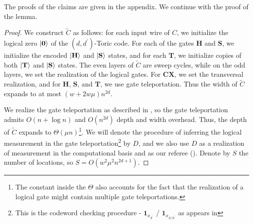 The proofs of the claims are given in the appendix. We continue with the proof of the lemma.
  \begin{proof}
    We construct $\tilde{C}$ as follows: for each input wire of $C$, we initialize the logical zero $\ket{\mathbf{0}}$ of the $(d,d^{\prime})$-Toric code. For each of the gates $\mathbf{H}$ and $\mathbf{S}$, we initialize the encoded $\ket{\mathbf{H}}$ and $\ket{\mathbf{S}}$ states, and for each $\mathbf{T}$, we initialize copies of both $\ket{\mathbf{T}}$ and $\ket{\mathbf{S}}$ states. The even layers of $\tilde{C}$ are sweep cycles, while on the odd layers, we set the realization of the logical gates. For $\mathbf{CX}$, we set the transversal realization, and for $\mathbf{H}$, $\mathbf{S}$, and $\mathbf{T}$, we use gate teleportation. Thus the width of $\tilde{C}$ expands to at most $ (w + 2w\mu) n^{2d}$.  
    

    
    
    We realize the gate teleportation as described in , so the gate teleportation admits $O(n + \log n)$ and $O(n^{2d})$ depth and width overhead. Thus, the depth of $\tilde{C}$ expands to $\Theta(\mu n)$\footnote{The constant inside the $\Theta$ also accounts for the fact that the realization of a logical gate might contain multiple gate teleportations.}. We will denote the procedure of inferring the logical measurement in the gate teleportation\footnote{This is the codeword checking procedure - $ \mathbf{1}_{x_{S^{\prime}}}$ / $ \mathbf{1}_{x_{S/S^{\prime}}}$ as appears in  } by $D$, and we also use $D$ as a realization of measurement in the computational basis and as our referee (). Denote by $S$ the number of locations, so $S = O(w^{2} \mu^{2} n^{2d+1} )$.
  

\end{proof}
